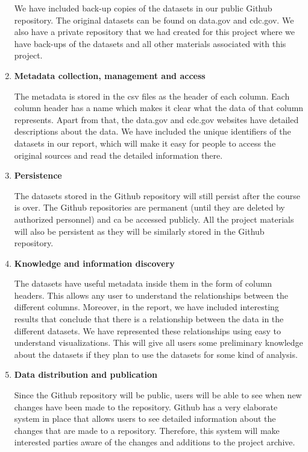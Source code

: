 \documentclass[journal,12pt,onecolumn]{IEEEtran}
\begin{document}
\begin{enumerate}
We have included back-up copies of the datasets in our public Github repository.
The original datasets can be found on data.gov and cdc.gov.
We also have a private repository that we had created for this project where we have back-ups of the datasets and all other materials associated with this project.

\item \textbf{Metadata collection, management and access}


The metadata is stored in the csv files as the header of each column.
Each column header has a name which makes it clear what the data of that column represents.
Apart from that, the data.gov and cdc.gov websites have detailed descriptions about the data.
We have included the unique identifiers of the datasets in our report, which will make it easy for people to access the original sources and read the detailed information there.


\item \textbf{Persistence}

The datasets stored in the Github repository will still persist after the course is over.
The Github repositories are permanent (until they are deleted by authorized personnel) and ca be accessed publicly.
All the project materials will also be persistent as they will be similarly stored in the Github repository.


\item \textbf{Knowledge and information discovery}


The datasets have useful metadata inside them in the form of column headers.
This allows any user to understand the relationships between the different columns. 
Moreover, in the report, we have included interesting results that conclude that there is a relationship between the data in the different datasets.
We have represented these relationships using easy to understand visualizations.
This will give all users some preliminary knowledge about the datasets if they plan to use the datasets for some kind of analysis.

\item \textbf{Data distribution and publication}

Since the Github repository will be public, users will be able to see when new changes have been made to the repository.
Github has a very elaborate system in place that allows users to see detailed information about the changes that are made to a repository.
Therefore, this system will make interested parties aware of the changes and additions to the project archive.

\end{enumerate}
\end{document}
